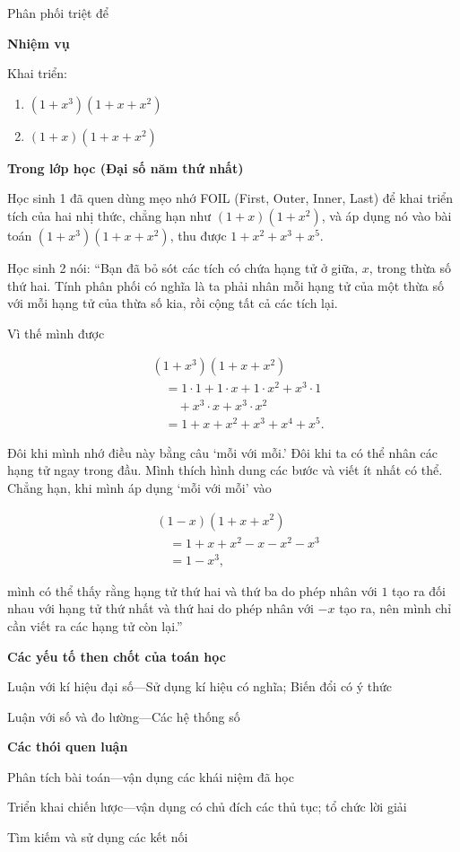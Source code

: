 \documentclass[
  10pt,
  a4paper,
  landscape,
  twoside,
  openany
]{scrbook}
\begin{document}
{Phân phối triệt để}
{
\noindent
\textbf{Nhiệm vụ}

Khai triển: 

\begin{enumerate}
  \item [(a)] $(1 + x^3)(1 + x + x^2)$
  \item [(b)] $(1 + x)(1 + x + x^2)$
\end{enumerate}

\noindent
\textbf{Trong lớp học (Đại số năm thứ nhất)}

Học sinh 1 đã quen dùng mẹo nhớ FOIL (First, Outer, Inner, Last) để khai triển tích của hai nhị thức, chẳng hạn như $(1 + x)(1 + x^2)$, và áp dụng nó vào bài toán $(1 + x^3)(1 + x + x^2)$, thu được $1 + x^2 + x^3 + x^5$.

Học sinh 2 nói: ``Bạn đã bỏ sót các tích có chứa hạng tử ở giữa, $x$, trong thừa số thứ hai. Tính phân phối có nghĩa là ta phải nhân mỗi hạng tử của một thừa số với mỗi hạng tử của thừa số kia, rồi cộng tất cả các tích lại.

Vì thế mình được

$$
\begin{aligned}
  &(1 + x^3)(1 + x + x^2) \\
    &\quad= 1 \cdot 1 + 1 \cdot x + 1 \cdot x^2 + x^3 \cdot 1 \\
    &\qquad + x^3 \cdot x + x^3 \cdot x^2 \\
    &\quad= 1 + x + x^2 + x^3 + x^4 + x^5.
\end{aligned}
$$

Đôi khi mình nhớ điều này bằng câu `mỗi với mỗi.' Đôi khi ta có thể nhân các hạng tử ngay trong đầu. Mình thích hình dung các bước và viết ít nhất có thể. Chẳng hạn, khi mình áp dụng `mỗi với mỗi' vào

$$
\begin{aligned}
  &(1 - x)(1 + x + x^2) \\
  &\quad = 1 + x + x^2 - x - x^2 - x^3 \\
  &\quad = 1 - x^3,
\end{aligned}
$$

mình có thể thấy rằng hạng tử thứ hai và thứ ba do phép nhân với $1$ tạo ra đối nhau với hạng tử thứ nhất và thứ hai do phép nhân với $-x$ tạo ra, nên mình chỉ cần viết ra các hạng tử còn lại.''


\noindent
\textbf{Các yếu tố then chốt của toán học}

Luận với kí hiệu đại số---Sử dụng kí hiệu có nghĩa; Biến đổi có ý thức

Luận với số và đo lường---Các hệ thống số

\noindent
\textbf{Các thói quen luận}

Phân tích bài toán---vận dụng các khái niệm đã học 

Triển khai chiến lược---vận dụng có chủ đích các thủ tục; tổ chức lời giải

Tìm kiếm và sử dụng các kết nối
}
{}
\end{document}
